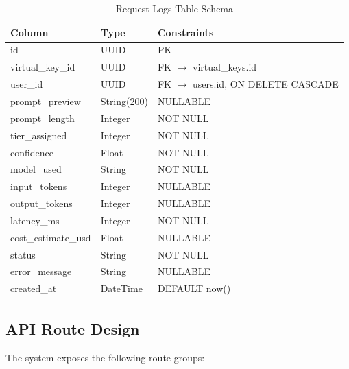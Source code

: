 \documentclass[12pt,a4paper]{report}
\begin{document}
\begin{table}[H]
    \centering
    \caption{Request Logs Table Schema}
    \label{tab:logs}
    \begin{tabularx}{\textwidth}{l l X}
    \toprule
    \textbf{Column} & \textbf{Type} & \textbf{Constraints} \\
    \midrule
    id & UUID & PK \\
    virtual\_key\_id & UUID & FK $\rightarrow$ virtual\_keys.id \\
    user\_id & UUID & FK $\rightarrow$ users.id, ON DELETE CASCADE \\
    prompt\_preview & String(200) & NULLABLE \\
    prompt\_length & Integer & NOT NULL \\
    tier\_assigned & Integer & NOT NULL \\
    confidence & Float & NOT NULL \\
    model\_used & String & NOT NULL \\
    input\_tokens & Integer & NULLABLE \\
    output\_tokens & Integer & NULLABLE \\
    latency\_ms & Integer & NOT NULL \\
    cost\_estimate\_usd & Float & NULLABLE \\
    status & String & NOT NULL \\
    error\_message & String & NULLABLE \\
    created\_at & DateTime & DEFAULT now() \\
    \bottomrule
    \end{tabularx}
\end{table}

\subsection{API Route Design}

The system exposes the following route groups:
\end{document}
